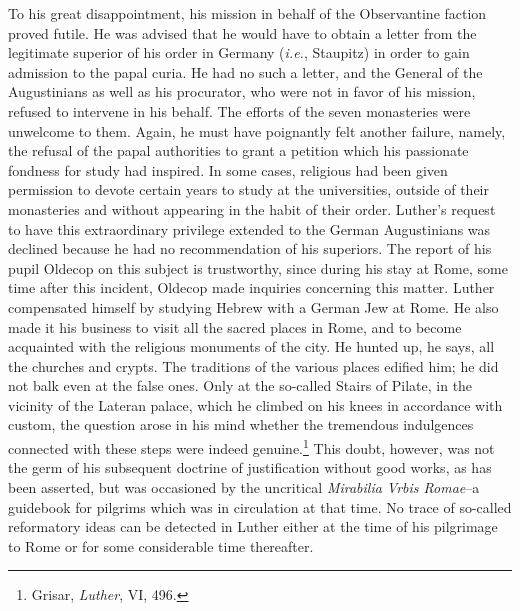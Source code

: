 To his great disappointment, his mission in behalf of the Observantine
faction proved futile. He was advised that he would have to
obtain a letter from the legitimate superior of his order in Germany
(\textit{i.e.}, Staupitz) in order to gain admission to the papal curia. He
had no such a letter, and the General of the Augustinians as well
as his procurator, who were not in favor of his mission, refused to
intervene in his behalf. The efforts of the seven monasteries were
unwelcome to them. Again, he must have poignantly felt another
failure, namely, the refusal of the papal authorities to grant a petition
which his passionate fondness for study had inspired. In some cases,
religious had been given permission to devote certain years to study
at the universities, outside of their monasteries and without appearing
in the habit of their order. Luther’s request to have this extraordinary
privilege extended to the German Augustinians was declined
because he had no recommendation of his superiors. The report of his
pupil Oldecop on this subject is trustworthy, since during his stay at
Rome, some time after this incident, Oldecop made inquiries concerning
this matter. Luther compensated himself by studying Hebrew
with a German Jew at Rome. He also made it his business to visit
all the sacred places in Rome, and to become acquainted with the
religious monuments of the city. He hunted up, he says, all the
churches and crypts. The traditions of the various places edified
him; he did not balk even at the false ones. Only at the so-called
Stairs of Pilate, in the vicinity of the Lateran palace, which he
climbed on his knees in accordance with custom, the question arose
in his mind whether the tremendous indulgences connected with
these steps were indeed genuine.\footnote{Grisar, \textit{Luther}, VI, 496.}
This doubt, however, was not the
germ of his subsequent doctrine of justification without good works,
as has been asserted, but was occasioned by the uncritical \textit{Mirabilia
Vrbis Romae}--a guidebook for pilgrims which was in circulation at
that time. No trace of so-called reformatory ideas can be detected in
Luther either at the time of his pilgrimage to Rome or for some
considerable time thereafter.


